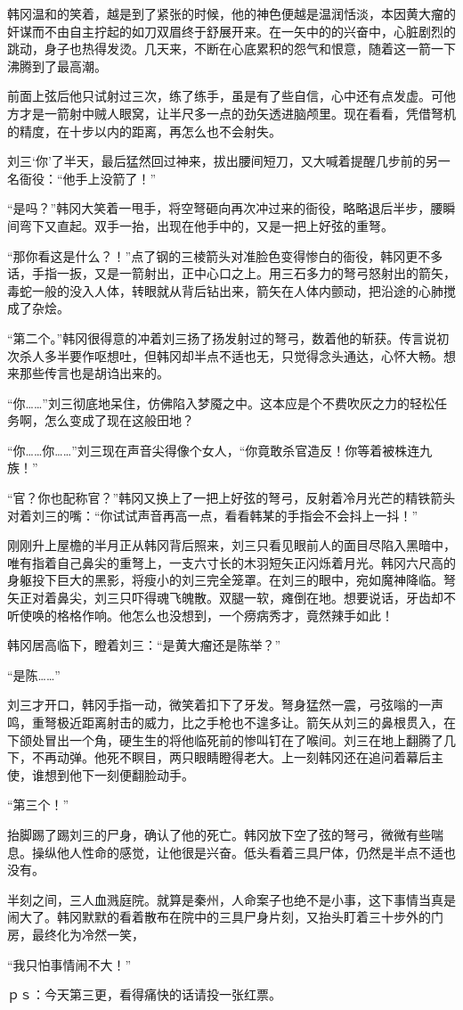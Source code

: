 韩冈温和的笑着，越是到了紧张的时候，他的神色便越是温润恬淡，本因黄大瘤的奸谋而不由自主拧起的如刀双眉终于舒展开来。在一矢中的的兴奋中，心脏剧烈的跳动，身子也热得发烫。几天来，不断在心底累积的怨气和恨意，随着这一箭一下沸腾到了最高潮。

前面上弦后他只试射过三次，练了练手，虽是有了些自信，心中还有点发虚。可他方才是一箭射中贼人眼窝，让半尺多一点的劲矢透进脑颅里。现在看看，凭借弩机的精度，在十步以内的距离，再怎么也不会射失。

刘三‘你’了半天，最后猛然回过神来，拔出腰间短刀，又大喊着提醒几步前的另一名衙役：“他手上没箭了！”

“是吗？”韩冈大笑着一甩手，将空弩砸向再次冲过来的衙役，略略退后半步，腰瞬间弯下又直起。双手一抬，出现在他手中的，又是一把上好弦的重弩。

“那你看这是什么？！”点了钢的三棱箭头对准脸色变得惨白的衙役，韩冈更不多话，手指一扳，又是一箭射出，正中心口之上。用三石多力的弩弓怒射出的箭矢，毒蛇一般的没入人体，转眼就从背后钻出来，箭矢在人体内颤动，把沿途的心肺搅成了杂烩。

“第二个。”韩冈很得意的冲着刘三扬了扬发射过的弩弓，数着他的斩获。传言说初次杀人多半要作呕想吐，但韩冈却半点不适也无，只觉得念头通达，心怀大畅。想来那些传言也是胡诌出来的。

“你……”刘三彻底地呆住，仿佛陷入梦魇之中。这本应是个不费吹灰之力的轻松任务啊，怎么变成了现在这般田地？

“你……你……”刘三现在声音尖得像个女人，“你竟敢杀官造反！你等着被株连九族！”

“官？你也配称官？”韩冈又换上了一把上好弦的弩弓，反射着冷月光芒的精铁箭头对着刘三的嘴：“你试试声音再高一点，看看韩某的手指会不会抖上一抖！”

刚刚升上屋檐的半月正从韩冈背后照来，刘三只看见眼前人的面目尽陷入黑暗中，唯有指着自己鼻尖的重弩上，一支六寸长的木羽短矢正闪烁着月光。韩冈六尺高的身躯投下巨大的黑影，将瘦小的刘三完全笼罩。在刘三的眼中，宛如魔神降临。弩矢正对着鼻尖，刘三只吓得魂飞魄散。双腿一软，瘫倒在地。想要说话，牙齿却不听使唤的格格作响。他怎么也没想到，一个痨病秀才，竟然辣手如此！

韩冈居高临下，瞪着刘三：“是黄大瘤还是陈举？”

“是陈……”

刘三才开口，韩冈手指一动，微笑着扣下了牙发。弩身猛然一震，弓弦嗡的一声鸣，重弩极近距离射击的威力，比之手枪也不遑多让。箭矢从刘三的鼻根贯入，在下颌处冒出一个角，硬生生的将他临死前的惨叫钉在了喉间。刘三在地上翻腾了几下，不再动弹。他死不瞑目，两只眼睛瞪得老大。上一刻韩冈还在追问着幕后主使，谁想到他下一刻便翻脸动手。

“第三个！”

抬脚踢了踢刘三的尸身，确认了他的死亡。韩冈放下空了弦的弩弓，微微有些喘息。操纵他人性命的感觉，让他很是兴奋。低头看着三具尸体，仍然是半点不适也没有。

半刻之间，三人血溅庭院。就算是秦州，人命案子也绝不是小事，这下事情当真是闹大了。韩冈默默的看着散布在院中的三具尸身片刻，又抬头盯着三十步外的门房，最终化为冷然一笑，

“我只怕事情闹不大！”

ｐｓ：今天第三更，看得痛快的话请投一张红票。

